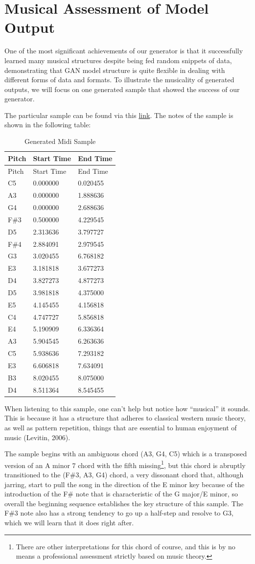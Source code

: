 \documentclass[12pt,oneside]{chicagocapstone}
\begin{document}
\newpage

\hypertarget{findings-assess_model}{%
\section*{Musical Assessment of Model Output}\label{findings-assess_model}}

One of the most significant achievements of our generator is that it successfully learned many musical structures despite being fed random snippets of data, demonstrating that GAN model structure is quite flexible in dealing with different forms of data and formats. To illustrate the musicality of generated outputs, we will focus on one generated sample that showed the success of our generator.

The particular sample can be found via this \href{https://github.com/terrywang15/museG_dev/blob/master/2020-01-31\%2002-20/ep_400.mid}{link}. The notes of the sample is shown in the following table:
\begin{longtable}[]{@{}lll@{}}
\caption{Generated Midi Sample}\tabularnewline
\toprule
Pitch & Start Time & End Time\tabularnewline
\midrule
\endfirsthead
\toprule
Pitch & Start Time & End Time\tabularnewline
\midrule
\endhead
C5 & 0.000000 & 0.020455\tabularnewline
A3 & 0.000000 & 1.888636\tabularnewline
G4 & 0.000000 & 2.688636\tabularnewline
F\#3 & 0.500000 & 4.229545\tabularnewline
D5 & 2.313636 & 3.797727\tabularnewline
F\#4 & 2.884091 & 2.979545\tabularnewline
G3 & 3.020455 & 6.768182\tabularnewline
E3 & 3.181818 & 3.677273\tabularnewline
D4 & 3.827273 & 4.877273\tabularnewline
D5 & 3.981818 & 4.375000\tabularnewline
E5 & 4.145455 & 4.156818\tabularnewline
C4 & 4.747727 & 5.856818\tabularnewline
E4 & 5.190909 & 6.336364\tabularnewline
A3 & 5.904545 & 6.263636\tabularnewline
C5 & 5.938636 & 7.293182\tabularnewline
E3 & 6.606818 & 7.634091\tabularnewline
B3 & 8.020455 & 8.075000\tabularnewline
D4 & 8.511364 & 8.545455\tabularnewline
\bottomrule
\end{longtable}
When listening to this sample, one can't help but notice how ``musical'' it sounds. This is because it has a structure that adheres to classical western music theory, as well as pattern repetition, things that are essential to human enjoyment of music (Levitin, 2006).

The sample begins with an ambiguous chord (A3, G4, C5) which is a transposed version of an A minor 7 chord with the fifth missing\footnote{There are other interpretations for this chord of course, and this is by no means a professional assessment strictly based on music theory.}, but this chord is abruptly transitioned to the (F\#3, A3, G4) chord, a very dissonant chord that, although jarring, start to pull the song in the direction of the E minor key because of the introduction of the F\# note that is characteristic of the G major/E minor, so overall the beginning sequence establishes the key structure of this sample. The F\#3 note also has a strong tendency to go up a half-step and resolve to G3, which we will learn that it does right after.
\end{document}
